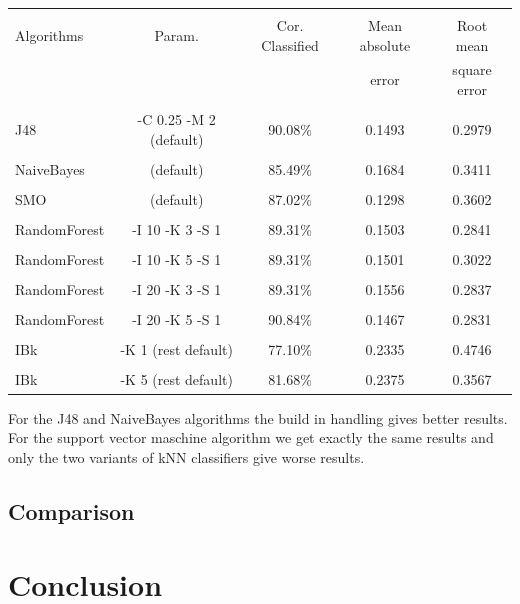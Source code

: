 \documentclass[a4paper]{article}
\begin{document}
\begin{table}
\begin{tabular}{|l| c | c | c | c |}
\hline & & & & \\
Algorithms & Param. & Cor. Classified & Mean absolute & Root mean \\
& & & error & square error\\
\hline & & & & \\
J48 &-C 0.25 -M 2 (default) & 90.08\% & 0.1493 & 0.2979 \\
\hline & & & & \\
NaiveBayes & (default) & 85.49\% & 0.1684 & 0.3411 \\
\hline & & & & \\
   SMO & (default) & 87.02\% & 0.1298 & 0.3602 \\
\hline & & & & \\
RandomForest & -I 10 -K 3 -S 1 & 89.31\% & 0.1503 & 0.2841 \\
\hline & & & & \\
RandomForest & -I 10 -K 5 -S 1 & 89.31\% & 0.1501 & 0.3022 \\
\hline & & & & \\
RandomForest & -I 20 -K 3 -S 1 & 89.31\% & 0.1556 & 0.2837 \\
\hline & & & & \\
RandomForest & -I 20 -K 5 -S 1 & 90.84\% & 0.1467 & 0.2831 \\
\hline & & & & \\
IBk          & -K 1 (rest default) & 77.10\% & 0.2335 & 0.4746 \\
\hline & & & & \\
IBk          & -K 5 (rest default) & 81.68\% & 0.2375 & 0.3567 \\
\hline 
\end{tabular}
\end{table}

For the J48 and NaiveBayes algorithms the build in handling gives better
results. For the support vector maschine algorithm we get exactly the same
results and only the two variants of kNN classifiers give worse results.
\subsection{Comparison}

\section{Conclusion}
\end{document}

